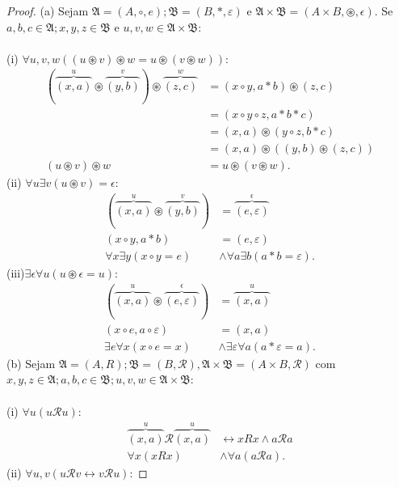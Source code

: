 \documentclass[11pt]{article}
\newcommand{\sse}{\leftrightarrow}
\newcommand{\mc}[1]{\mathcal{#1}}
\newcommand{\mf}[1]{\mathfrak{#1}}
\begin{document}
\begin{proof}
    (a) Sejam $\mf{A}=(A,\circ,e);\mf{B}=(B,*,\varepsilon)$ e $\mf{A}\times\mf{B}=(A\times B,\circledast,\epsilon)$. Se $a,b,c\in\mf{A};x,y,z\in\mf{B}$ e $u,v,w\in\mf{A}\times\mf{B}$:\\\\
    (i) $\forall u,v,w((u\circledast v)\circledast w = u\circledast(v\circledast w))$:
    \begin{align*}
        (\overbrace{(x,a)}^u\circledast \overbrace{(y,b)}^v)\circledast \overbrace{(z,c)}^w & = (x\circ y,a*b)\circledast (z,c)\\
        & = (x\circ y\circ z,a*b*c)\\
        & = (x,a)\circledast(y\circ z,b*c)\\
        & = (x,a)\circledast((y,b)\circledast(z,c))\\
        (u\circledast v)\circledast w & = u\circledast(v\circledast w).
    \end{align*}
    (ii) $\forall u\exists v(u\circledast v)=\epsilon$:
    \begin{align*}
        (\overbrace{(x,a)}^u\circledast\overbrace{(y,b)}^v) & = \overbrace{(e,\varepsilon)}^\epsilon\\
        (x\circ y,a*b) & =(e,\varepsilon)\\
        \forall x\exists y(x\circ y=e)& \wedge \forall a\exists b(a*b=\varepsilon).
    \end{align*}
    (iii)$\exists\epsilon\forall u(u\circledast\epsilon=u)$:
    \begin{align*}
        (\overbrace{(x,a)}^u\circledast\overbrace{(e,\varepsilon)}^\epsilon) & =\overbrace{(x,a)}^u\\
        (x\circ e,a\circ\varepsilon) & = (x,a)\\
        \exists e\forall x(x\circ e=x) & \wedge \exists\varepsilon\forall a(a*\varepsilon=a).
    \end{align*}
    (b) Sejam $\mf{A}=(A,R);\mf{B}=(B,\mc{R}),\mf{A}\times\mf{B}=(A\times B,\mathscr{R})$ com $x,y,z\in\mf{A};a,b,c\in\mf{B};u,v,w\in\mf{A}\times\mf{B}$:\\\\
    (i) $\forall u(u\mathscr{R}u)$:
    \begin{align*}
        \overbrace{(x,a)}^u\mathscr{R}\overbrace{(x,a)}^u & \sse xRx\wedge a\mc{R}a\\
        \forall x(xRx) & \wedge \forall a(a\mc{R}a).
    \end{align*}
    (ii) $\forall u,v(u\mathscr{R}v\sse v\mathscr{R}u)$:

\end{proof}
\end{document}
